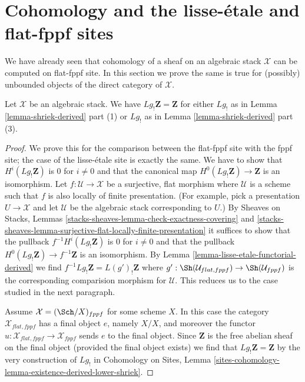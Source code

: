 \section{Cohomology and the lisse-\'etale and flat-fppf sites}
\label{section-compare-unbounded-lisse-etale}

\noindent
We have already seen that cohomology of a sheaf on an algebraic
stack $\mathcal{X}$ can be computed on flat-fppf site. In this
section we prove the same is true for (possibly) unbounded
objects of the direct category of $\mathcal{X}$.

\begin{lemma}
\label{lemma-higher-shriek-Z}
Let $\mathcal{X}$ be an algebraic stack. We have
$Lg_!\mathbf{Z} = \mathbf{Z}$ for either $Lg_!$ as in
Lemma \ref{lemma-shriek-derived} part (1) or $Lg_!$ as in
Lemma \ref{lemma-shriek-derived} part (3).
\end{lemma}

\begin{proof}
We prove this for the comparison between the flat-fppf site with the
fppf site; the case of the lisse-\'etale site is exactly the same.
We have to show that $H^i(Lg_!\mathbf{Z})$ is $0$ for $i \not = 0$
and that the canonical map $H^0(Lg_!\mathbf{Z}) \to \mathbf{Z}$
is an isomorphism. Let $f : \mathcal{U} \to \mathcal{X}$ be a
surjective, flat morphism where $\mathcal{U}$ is a scheme
such that $f$ is also locally of finite presentation.
(For example, pick a presentation $U \to \mathcal{X}$ and
let $\mathcal{U}$ be the algebraic stack corresponding to $U$.)
By Sheaves on Stacks, Lemmas
\ref{stacks-sheaves-lemma-check-exactness-covering} and
\ref{stacks-sheaves-lemma-surjective-flat-locally-finite-presentation}
it suffices to show that the pullback $f^{-1}H^i(Lg_!\mathbf{Z})$
is $0$ for $i \not = 0$ and that the pullback
$H^0(Lg_!\mathbf{Z}) \to f^{-1}\mathbf{Z}$ is an isomorphism.
By Lemma \ref{lemma-lisse-etale-functorial-derived} we find
$f^{-1}Lg_!\mathbf{Z} = L(g')_!\mathbf{Z}$ where
$g' : \Sh(\mathcal{U}_{flat, fppf}) \to \Sh(\mathcal{U}_{fppf})$
is the corresponding comparision morphism for $\mathcal{U}$.
This reduces us to the case studied in the next paragraph.

\medskip\noindent
Assume $\mathcal{X} = (\Sch/X)_{fppf}$ for some scheme $X$.
In this case the category $\mathcal{X}_{flat, fppf}$ has
a final object $e$, namely $X/X$, and moreover the functor
$u : \mathcal{X}_{flat, fppf} \to \mathcal{X}_{fppf}$
sends $e$ to the final object. Since $\mathbf{Z}$ is the
free abelian sheaf on the final object (provided the final
object exists) we find that $Lg_!\mathbf{Z} = \mathbf{Z}$ by
the very construction of $Lg_!$ in Cohomology on Sites,
Lemma \ref{sites-cohomology-lemma-existence-derived-lower-shriek}.
\end{proof}

